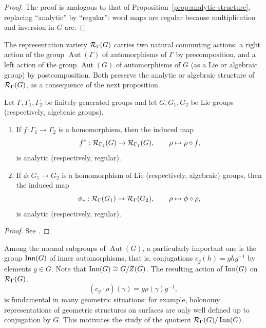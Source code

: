 \begin{proof}
    The proof is analogous to that of Proposition~\ref{prop:analytic-structure}, replacing ``analytic'' by ``regular'': word maps are regular because multiplication and inversion in $G$ are.
\end{proof}

The representation variety $\RepVar{\Gamma}{G}$ carries two natural commuting actions: a right action of the group $\operatorname{Aut}(\Gamma)$ of automorphisms of $\Gamma$ by precomposition, and a left action of the group $\operatorname{Aut}(G)$ of automorphisms of $G$ (as a Lie or algebraic group) by postcomposition. Both preserve the analytic or algebraic structure of $\RepVar{\Gamma}{G}$, as a consequence of the next proposition.

\begin{proposition}\label{prop:functoriality}
    Let $\Gamma, \Gamma_1, \Gamma_2$ be finitely generated groups and let $G, G_1, G_2$ be Lie groups (respectively, algebraic groups).
    \begin{enumerate}
        \item If $f : \Gamma_1 \to \Gamma_2$ is a homomorphism, then the induced map
        \[
            f^* : \RepVar{\Gamma_2}{G} \to \RepVar{\Gamma_1}{G}, \qquad \rho \mapsto \rho \circ f,
        \]
        is analytic (respectively, regular).
        \item If $\phi : G_1 \to G_2$ is a homomorphism of Lie (respectively, algebraic) groups, then the induced map
        \[
            \phi_* : \RepVar{\Gamma}{G_1} \to \RepVar{\Gamma}{G_2}, \qquad \rho \mapsto \phi \circ \rho,
        \]
        is analytic (respectively, regular).
    \end{enumerate}
\end{proposition}

\begin{proof}
    See \cite[Lemma~1.2.7]{maret_note_nodate}.
\end{proof}

Among the normal subgroups of $\operatorname{Aut}(G)$, a particularly important one is the group $\operatorname{Inn}(G)$ of inner automorphisms, that is, conjugations $c_g(h) = ghg^{-1}$ by elements $g \in G$. Note that $\operatorname{Inn}(G) \cong G / Z(G)$. The resulting action of $\operatorname{Inn}(G)$ on $\RepVar{\Gamma}{G}$,
\[
    (c_g \cdot \rho)(\gamma) = g \rho(\gamma) g^{-1},
\]
is fundamental in many geometric situations: for example, holonomy representations of geometric structures on surfaces are only well defined up to conjugation by $G$. This motivates the study of the quotient $\RepVar{\Gamma}{G} / \Inn(G)$.


